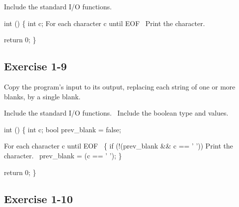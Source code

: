 \nwenddocs{}\endmoddef\nwstartdeflinemarkup\nwenddeflinemarkup
\LA{}Include the standard I/O functions.~{\nwtagstyle{}}\RA{}


int ()
\{
    int c;
    \LA{}For each character \code{}c\edoc{} until \code{}EOF\edoc{}~{\nwtagstyle{}}\RA{}
        \LA{}Print the character.~{\nwtagstyle{}}\RA{}

    return 0;
\}
\nwendcode{}\nwdocspar
\nwenddocs{}\subsection{Exercise 1-9}

Copy the program's input to its output, replacing each string of one or more
blanks, by a single blank.

\nwenddocs{}\endmoddef\nwstartdeflinemarkup\nwenddeflinemarkup
\LA{}Include the standard I/O functions.~{\nwtagstyle{}}\RA{}
\LA{}Include the boolean type and values.~{\nwtagstyle{}}\RA{}


int ()
\{
    int c;
    bool prev_blank = false;

    \LA{}For each character \code{}c\edoc{} until \code{}EOF\edoc{}~{\nwtagstyle{}}\RA{} \{
        if (!(prev_blank && c == ' '))
            \LA{}Print the character.~{\nwtagstyle{}}\RA{}
        prev_blank = (c == ' ');
    \}


    return 0;
\}
\nwendcode{}\nwdocspar
\nwenddocs{}\subsection{Exercise 1-10}

